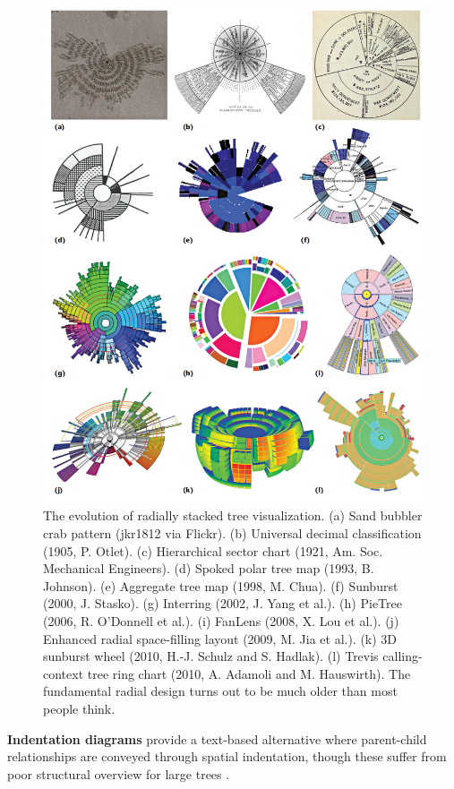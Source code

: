 \begin{figure}[p]
    \centering
    \includegraphics[width=0.85\linewidth]{images/treevis1.png}
    \caption{The evolution of radially stacked tree visualization. (a) Sand bubbler crab pattern (jkr1812 via Flickr).
(b) Universal decimal classification (1905, P. Otlet). (c) Hierarchical sector chart (1921, Am. Soc. Mechanical
Engineers). (d) Spoked polar tree map (1993, B. Johnson). (e) Aggregate tree map (1998, M. Chua). (f) Sunburst
(2000, J. Stasko). (g) Interring (2002, J. Yang et al.). (h) PieTree (2006, R. O’Donnell et al.). (i) FanLens (2008,
X. Lou et al.). (j) Enhanced radial space-filling layout (2009, M. Jia et al.). (k) 3D sunburst wheel (2010, H.-J.
Schulz and S. Hadlak). (l) Trevis calling-context tree ring chart (2010, A. Adamoli and M. Hauswirth). The
fundamental radial design turns out to be much older than most people think.}
    \label{fig:radial_evolution}
\end{figure}

\textbf{Indentation diagrams} provide a text-based alternative where parent-child relationships are conveyed through spatial indentation, though these suffer from poor structural overview for large trees \cite{elzen2011baobabview}. 

